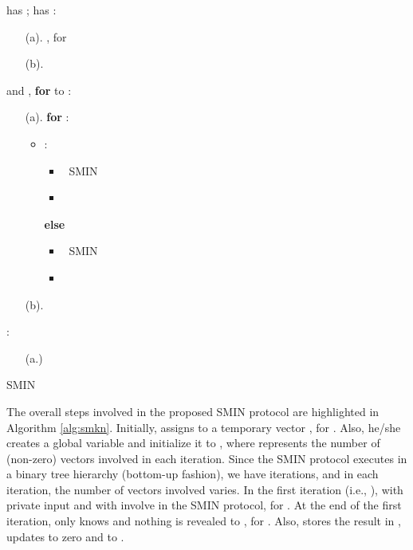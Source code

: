 \documentclass{article}
\begin{document}
\begin{algorithm}[t]
\begin{algorithmic}[1]
\REQUIRE  has ;  has 
\STATE : 
\begin{enumerate}\itemsep=0pt
  \item[(a).] , for 
  \item[(b).] 
\end{enumerate}    
\STATE  and , \textbf{for}  to :
\begin{enumerate}\itemsep=0pt
    \item[(a).] \textbf{for} : 
              \begin{itemize}
               \item : 
                             \begin{itemize}\itemsep=2pt
                                 \item ~SMIN
                                 \item   
                             \end{itemize} 
                      \textbf{else}
                            \begin{itemize}\itemsep=2pt
                                 \item ~SMIN
                                  \item  
                            \end{itemize} 
                                                                  
                 \end{itemize}               
    \item[(b).]  
\end{enumerate}
\STATE :
\begin{enumerate}\itemsep=2pt
    \item[(a.)] 
\end{enumerate}
\end{algorithmic}
\caption{SMIN}
\label{alg:smkn}
\end{algorithm}

The overall steps involved in the proposed SMIN protocol are highlighted in 
Algorithm \ref{alg:smkn}. Initially,  assigns  to a temporary vector , for 
. Also, he/she creates a global variable  and initialize it to 
, where  represents 
the number of (non-zero) vectors involved in each iteration. Since the 
SMIN protocol executes in a binary tree hierarchy (bottom-up fashion), we have 
 iterations, and in each iteration, the number of vectors 
involved varies. In the first iteration (i.e., ),   
with private input   and  with  involve 
in the SMIN protocol, for 
. At the end of the 
first iteration, only  knows 
 and nothing is revealed to , for .
Also,  stores the result  in , 
updates  to zero and  to . 
\end{document}
